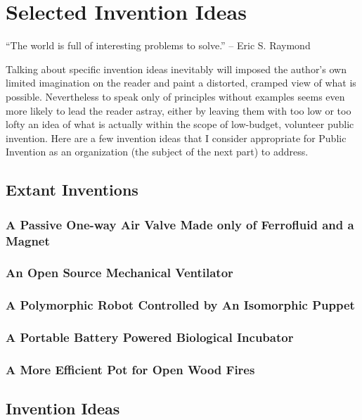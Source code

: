 \documentclass[
	fontsize=10pt, %
	twoside=false, %
	secnumdepth=1, %
]{kaobook}
\begin{document}
\chapter{Selected Invention Ideas}

``The world is full of interesting problems to solve.'' -- Eric S. Raymond

Talking about specific invention ideas inevitably will imposed the author's own limited
imagination on the reader and paint a distorted, cramped view of what is possible.
Nevertheless to speak only of principles without examples seems even more
likely to lead the reader astray, either by leaving them with too low or too lofty
an idea of what is actually within the scope of low-budget, volunteer public invention.
Here are a few invention ideas that I consider appropriate for Public Invention
as an organization (the subject of the next part) to address.

\section{Extant Inventions}
\subsection{A Passive One-way Air Valve Made only of Ferrofluid and a Magnet}

\subsection{An Open Source Mechanical Ventilator}

\subsection{A Polymorphic Robot Controlled by An Isomorphic Puppet}

\subsection{A Portable Battery Powered Biological Incubator}

\subsection{A More Efficient Pot for Open Wood Fires}

\section{Invention Ideas}
\end{document}
